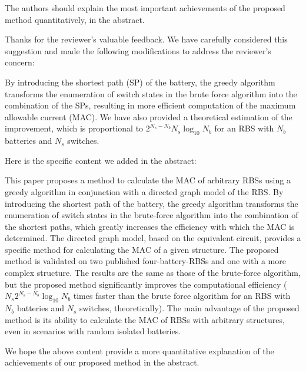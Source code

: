 
\reviewer
\begin{revcomment}
  The authors should explain the most important achievements of the proposed method quantitatively, in the abstract.
\end{revcomment}
\begin{revresponse}

Thanks for the reviewer's valuable feedback. We have carefully considered this suggestion and made the following modifications to address the reviewer's concern:


By introducing the shortest path (SP) of the battery, the greedy algorithm transforms the enumeration of switch states in the brute force algorithm into the combination of the SPs, resulting in more efficient computation of the maximum allowable current (MAC).
We have also provided a theoretical estimation of the improvement, which is proportional to $2^{N_s - N_b} N_s \log_{10} N_b$ for an RBS with $N_b$ batteries and $N_s$ switches.


Here is the specific content we added in the abstract:
\begin{changes}
This paper proposes a method to calculate the MAC of arbitrary RBSs using a greedy algorithm in conjunction with a directed graph model of the RBS.
By introducing the shortest path of the battery, the greedy algorithm transforms the enumeration of switch states in the brute-force algorithm into the combination of the shortest paths, which greatly increases the efficiency with which the MAC is determined.
The directed graph model, based on the equivalent circuit, provides a specific method for calculating the MAC of a given structure.
The proposed method is validated on two published four-battery-RBSs and one with a more complex structure.
The results are the same as those of the brute-force algorithm, but the proposed method significantly improves the computational efficiency ($N_s 2^{N_s - N_b} \log_{10} N_b$ times faster than the brute force algorithm for an RBS with $N_b$ batteries and $N_s$ switches, theoretically).
The main advantage of the proposed method is its ability to calculate the MAC of RBSs with arbitrary structures, even in scenarios with random isolated batteries.
\end{changes}


We hope the above content provide a more quantitative explanation of the achievements of our proposed method in the abstract. 

\end{revresponse}

